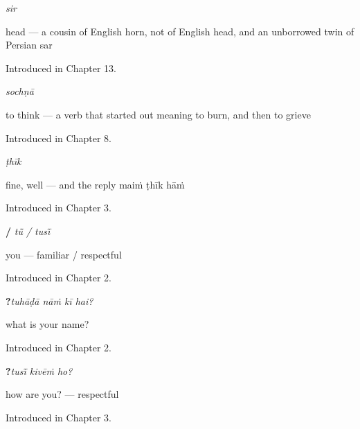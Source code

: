 \noindent\begin{minipage}[t]{\linewidth}
\raggedright
\textbf{}\enspace\emph{sir}\par
\small head — a cousin of English horn, not of English head, and an unborrowed twin of Persian sar\par
\footnotesize Introduced in Chapter 13.
\end{minipage}\par\medskip

\noindent\begin{minipage}[t]{\linewidth}
\raggedright
\textbf{}\enspace\emph{sochṇā}\par
\small to think — a verb that started out meaning to burn, and then to grieve\par
\footnotesize Introduced in Chapter 8.
\end{minipage}\par\medskip

\noindent\begin{minipage}[t]{\linewidth}
\raggedright
\textbf{}\enspace\emph{ṭhīk}\par
\small fine, well — and the reply maiṁ ṭhīk hāṁ\par
\footnotesize Introduced in Chapter 3.
\end{minipage}\par\medskip

\noindent\begin{minipage}[t]{\linewidth}
\raggedright
\textbf{ / }\enspace\emph{tū̃ / tusī̃}\par
\small you — familiar / respectful\par
\footnotesize Introduced in Chapter 2.
\end{minipage}\par\medskip

\noindent\begin{minipage}[t]{\linewidth}
\raggedright
\textbf{   ?}\enspace\emph{tuhāḍā nāṁ kī hai?}\par
\small what is your name?\par
\footnotesize Introduced in Chapter 2.
\end{minipage}\par\medskip

\noindent\begin{minipage}[t]{\linewidth}
\raggedright
\textbf{  ?}\enspace\emph{tusī̃ kivēṁ ho?}\par
\small how are you? — respectful\par
\footnotesize Introduced in Chapter 3.
\end{minipage}\par\medskip

